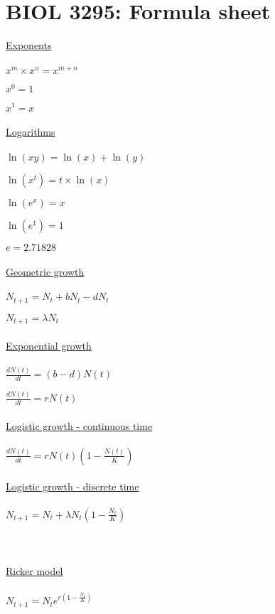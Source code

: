 \documentclass[11pt, oneside, twocolumn]{article} 	%
\begin{document}
\section*{BIOL 3295: Formula sheet}

\underline{Exponents}
\\
\\
$x^m \times x^n = x^{m+n}$

$x^0 = 1$

$x^1 = x$
\\
\\

\underline{Logarithms}
\\
\\
$\ln(xy) = \ln(x) + \ln(y)$

$\ln(x^t) = t \times \ln(x)$

$\ln(e^x) = x$

$\ln(e^1) = 1$

$e = 2.71828$
\\
\\

\underline{Geometric growth}
\\
\\
$N_{t+1} = N_t + bN_t - dN_t$

$N_{t+1} = \lambda N_t$
\\
\\

\underline{Exponential growth}
\\
\\
$\frac{dN(t)}{dt} = (b - d)N(t)$

$\frac{dN(t)}{dt} = rN(t)$
\\
\\



\underline{Logistic growth - continuous time}
\\
\\
$\frac{dN(t)}{dt} = r N(t)\left(1-\frac{N(t)}{K} \right)$
\\
\\

\underline{Logistic growth - discrete time}
\\
\\
$N_{t+1} = N_t + \lambda N_t\left(1 - \frac{N_t}{K} \right)$
\\
\\
\\
\\

\underline{Ricker model}
\\
\\
$N_{t+1} = N_te^{r\left(1 - \frac{N_t}{K}\right)}$
\\
\\
\end{document}
